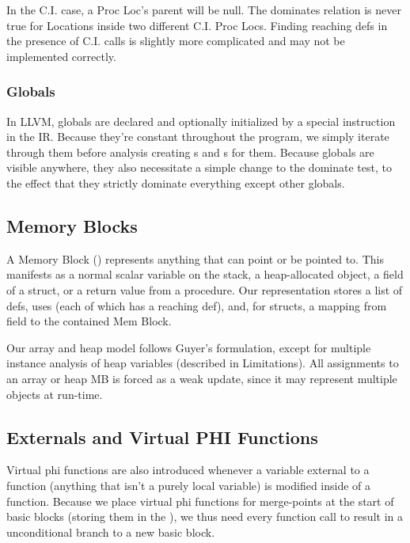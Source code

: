 In the C.I. case, a Proc Loc's parent will be null. The dominates relation is
never true for Locations inside two different C.I. Proc Locs. Finding reaching
defs in the presence of C.I. calls is slightly more complicated and may not be
implemented correctly.

\subsubsection{Globals}

In LLVM, globals are declared and optionally initialized by a special  
instruction in the IR. Because they're constant throughout the program, we simply
iterate through them before analysis creating s and s
for them. Because globals are visible anywhere, they also necessitate a simple change
to the dominate test, to the effect that they strictly dominate everything except 
other globals.

\subsection{Memory Blocks}

A Memory Block () represents anything that can point or be
pointed to. This manifests as a normal scalar variable on the stack, a
heap-allocated object, a field of a struct, or a return value from a procedure.
Our representation stores a list of defs, uses (each of which has a reaching
def), and, for structs, a mapping from field to the contained Mem Block.

Our array and heap model follows Guyer's formulation, except for multiple
instance analysis of heap variables (described in Limitations). All assignments
to an array or heap MB is forced as a weak update, since it may represent
multiple objects at run-time.

\subsection{Externals and Virtual PHI Functions}

Virtual phi functions are also introduced whenever a variable external to a
function (anything that isn't a purely local variable) is modified inside of a
function. Because we place virtual phi functions for merge-points at the start
of basic blocks (storing them in the ), we thus need every
function call to result in a unconditional branch to a new basic block.

